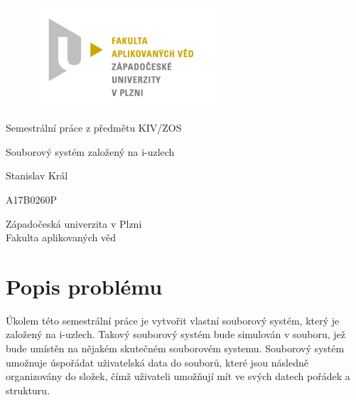 \documentclass[12pt, a4paper]{article}
\let\oldsection\section
\renewcommand\section{\clearpage\oldsection}
\begin{document}
	\renewcommand{\lstlistingname}{Ukázka zprávy}
	\renewcommand{\lstlistlistingname}{Seznam ukázek}
    \begin{titlepage}

       \centering

       \vspace*{\baselineskip}

       \begin{figure}[H]
          \centering
          \includegraphics[width=7cm]{img/fav-logo.jpg}
       \end{figure}

       \vspace*{1\baselineskip}
       {\sc Semestrální práce z předmětu KIV/ZOS}
       \vspace*{1\baselineskip}

       \vspace{0.75\baselineskip}

       {\LARGE\sc Souborový systém založený na i-uzlech\\}

       \vspace{4\baselineskip}
       
		\vspace{0.5\baselineskip}

       
       {\sc\Large Stanislav Král \\}

       \vspace{0.5\baselineskip}

       {A17B0260P}

       \vfill

       {\sc Západočeská univerzita v Plzni\\
       Fakulta aplikovaných věd}


    \end{titlepage}


    \tableofcontents
    \pagebreak


    \section{Popis problému}
    Úkolem této semestrální práce je vytvořit vlastní souborový systém, který je založený na i-uzlech. Takový souborový systém bude simulován v souboru, jež bude umístěn na nějakém skutečném souborovém systemu. Souborový systém umožnuje úspořádat uživatelská data do souborů, které jsou následně organizovány do složek, čímž uživateli umožňují mít ve svých datech pořádek a strukturu.
    
\end{document}
